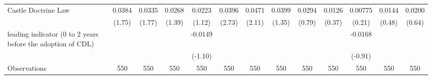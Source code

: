 \begin{tabular}{l*{12}{c}}
Castle Doctrine Law &      0.0384         &      0.0335         &      0.0268         &      0.0223         &      0.0396\sym{**} &      0.0471\sym{*}  &      0.0399         &      0.0294         &      0.0126         &     0.00775         &      0.0144         &      0.0200         \\
                    &      (1.75)         &      (1.77)         &      (1.39)         &      (1.12)         &      (2.73)         &      (2.11)         &      (1.35)         &      (0.79)         &      (0.37)         &      (0.21)         &      (0.48)         &      (0.64)         \\
[1em]
leading indicator (0 to 2 years before the adoption of CDL)&                     &                     &                     &     -0.0149         &                     &                     &                     &                     &                     &     -0.0168         &                     &                     \\
                    &                     &                     &                     &     (-1.10)         &                     &                     &                     &                     &                     &     (-0.91)         &                     &                     \\
\hline
Observations        &         550         &         550         &         550         &         550         &         550         &         550         &         550         &         550         &         550         &         550         &         550         &         550         \\
\hline\hline \end{tabular}
